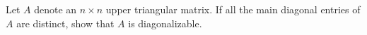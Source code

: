 \documentclass{ximera}
\begin{document}




\begin{problem}\label{prb:upper_triangular_case}
Let $A$ denote an $n \times n$ upper triangular matrix.
If all the main diagonal entries of $A$ are distinct, show that $A$ is diagonalizable.

\end{problem}
\end{document}
